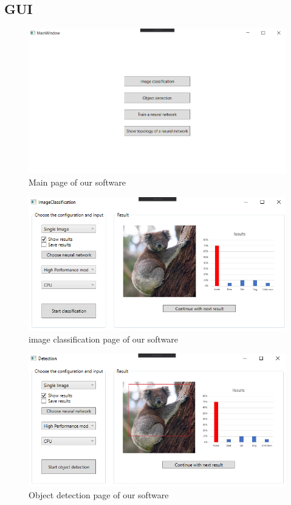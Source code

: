\documentclass[parskip=full]{scrartcl}
\begin{document}
\subsection{GUI}
\begin{figure}[htb!]\centering
\includegraphics[width=\textwidth]{MainPageGUI}
\caption{Main page of our software}
\end{figure}
\begin{figure}[htb!]\centering
\includegraphics[width=\textwidth]{ImageClassificationGUI}
\caption{\gls{image classification} page of our software}
\end{figure}
\begin{figure}[htb!]\centering
\includegraphics[width=\textwidth]{DetectionGUI}
\caption{Object detection page of our software}
\end{figure}
\end{document}

